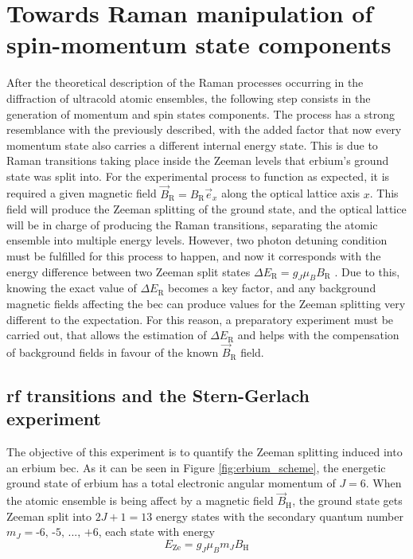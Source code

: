 
\chapter{Towards Raman manipulation of spin-momentum state components}
\label{chap:raman_manipulation}

After the theoretical description of the Raman processes occurring in the diffraction of ultracold atomic ensembles, the following step consists in the generation of momentum and spin states components. The process has a strong resemblance with the previously described, with the added factor that now every momentum state also carries a different internal energy state. This is due to Raman transitions taking place inside the Zeeman levels that erbium's ground state was split into. For the experimental process to function as expected, it is required a given magnetic field $\vec{B}_\text{R} = B_{\text{R}} \vec{e}_x$ along the optical lattice axis $x$. This field will produce the Zeeman splitting of the ground state, and the optical lattice will be in charge of producing the Raman transitions, separating the atomic ensemble into multiple energy levels. However, two photon detuning condition must be fulfilled for this process to happen, and now it corresponds with the energy difference between two Zeeman split states $\Delta E_\text{R} = g_J \mu_B B_\text{R}$ \cite{Foot2005}. Due to this, knowing the exact value of $\Delta E_\text{R}$ becomes a key factor, and any background magnetic fields  affecting the \ac{bec} can produce values for the Zeeman splitting very different to the expectation. For this reason, a preparatory experiment must be carried out, that allows the estimation of $\Delta E_\text{R}$ and helps with the compensation of background fields in favour of the known $\vec{B}_\text{R}$ field.

\section{\Acl{rf} transitions and the Stern-Gerlach experiment}\label{sec:rf_transitions}

The objective of this experiment is to quantify the Zeeman splitting induced into an erbium \ac{bec}. As it can be seen in Figure \ref{fig:erbium_scheme}, the energetic ground state of erbium has a total electronic angular momentum of $J = 6$. When the atomic ensemble is being affect by a magnetic field $\vec{B}_\text{H}$, the ground state gets Zeeman split into $2J+1 = 13$ energy states with the secondary quantum number $m_J = \text{-6, -5, ..., +6}$, each state with energy \cite{Foot2005}
\begin{equation}
	E_\text{Ze} = g_J \mu_B m_J B_\text{H}
\end{equation}

